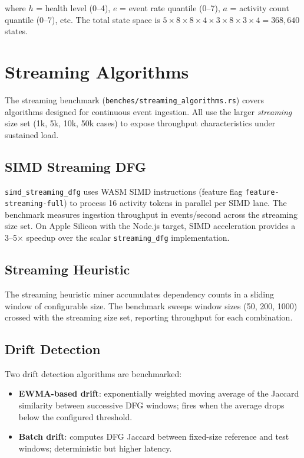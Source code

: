 \documentclass[11pt,a4paper]{article}
\begin{document}
where $h$ = health level (0--4), $e$ = event rate quantile (0--7),
$a$ = activity count quantile (0--7), etc. The total state space is
$5 \times 8 \times 8 \times 4 \times 3 \times 8 \times 3 \times 4 = 368{,}640$ states.

\section{Streaming Algorithms}
\label{sec:streaming}

The streaming benchmark (\texttt{benches/streaming\_algorithms.rs}) covers
algorithms designed for continuous event ingestion. All use the larger
\emph{streaming} size set (1k, 5k, 10k, 50k cases) to expose throughput
characteristics under sustained load.

\subsection{SIMD Streaming DFG}

\texttt{simd\_streaming\_dfg} uses WASM SIMD instructions (feature flag
\texttt{feature-streaming-full}) to process 16 activity tokens in parallel
per SIMD lane. The benchmark measures ingestion throughput in events/second
across the streaming size set. On Apple Silicon with the Node.js target,
SIMD acceleration provides a 3--5$\times$ speedup over the scalar
\texttt{streaming\_dfg} implementation.

\subsection{Streaming Heuristic}

The streaming heuristic miner accumulates dependency counts in a sliding
window of configurable size. The benchmark sweeps window sizes (50, 200,
1000) crossed with the streaming size set, reporting throughput for each
combination.

\subsection{Drift Detection}

Two drift detection algorithms are benchmarked:

\begin{itemize}
  \item \textbf{EWMA-based drift}: exponentially weighted moving average
        of the Jaccard similarity between successive DFG windows; fires
        when the average drops below the configured threshold.
  \item \textbf{Batch drift}: computes DFG Jaccard between fixed-size
        reference and test windows; deterministic but higher latency.
\end{itemize}
\end{document}
